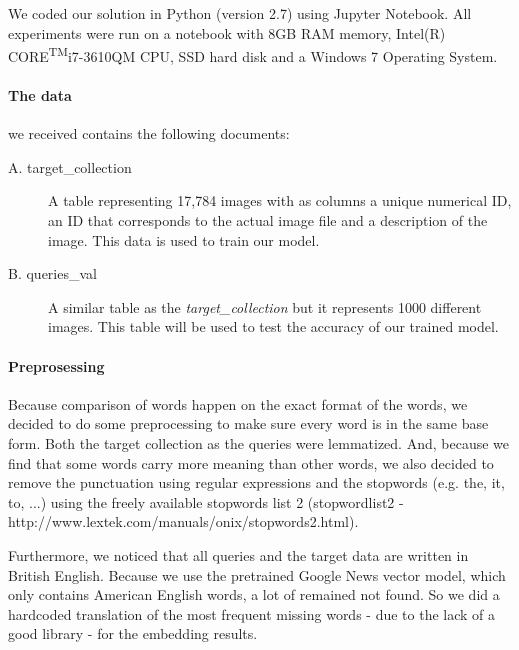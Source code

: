 
We coded our solution in Python (version 2.7) using Jupyter Notebook. All experiments were run on a notebook with 8GB RAM memory, Intel(R) CORE\textsuperscript{TM}i7-3610QM CPU, SSD hard disk and a Windows 7 Operating System.

\paragraph{The data}
we received contains the following documents:
\begin{description}
	\item[A. target\_collection] A table representing 17,784 images with as columns a unique numerical ID, an ID that corresponds to the actual image file and a description of the image. This data is used to train our model.
	\item[B. queries\_val] A similar table as the \textit{target\_collection} but it represents 1000 different images. This table will be used to test the accuracy of our trained model.
\end{description}

\paragraph{Preprosessing}
Because comparison of words happen on the exact format of the words, we decided to do some preprocessing to make sure every word is in the same base form. Both the target collection as the queries were lemmatized. And, because we find that some words carry more meaning than other words, we also decided to remove the punctuation using regular expressions and the stopwords (e.g. the, it, to, ...) using the freely available stopwords list 2 (stopwordlist2 - http://www.lextek.com/manuals/onix/stopwords2.html).

Furthermore, we noticed that all queries and the target data are written in British English. Because we use the pretrained Google News vector model, which only contains American English words, a lot of remained not found. So we did a hardcoded translation of the most frequent missing words - due to the lack of a good library - for the embedding results.